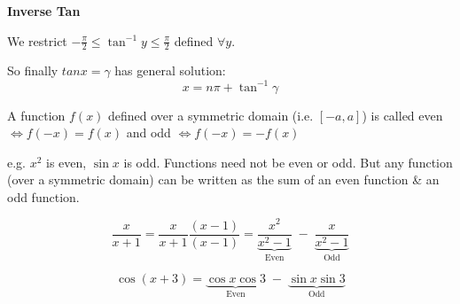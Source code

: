\documentclass[10pt]{scrartcl}
\begin{document}
\textbf{Inverse Tan}\\
\begin{minipage}{7cm}


We restrict $-\frac{\pi}{2} \leq \tan^{-1}y \leq \frac{\pi}{2}$ defined $\forall y$.

So finally $tanx = \gamma$ has general solution: 
\[\boxed{x = n\pi + \tan^{-1}\gamma}\]
\end{minipage}
\begin{minipage}{7cm}
  \begin{center}
\end{center}
\end{minipage}
\vspace*{10pt}

\vspace*{5pt}
\begin{definition} 
A function $f(x)$ defined over a symmetric domain (i.e. $[-a,a]$) is called even $\iff f(-x) = f(x)$ and odd $\iff f(-x) = -f(x)$
\end{definition}

e.g. $x^2$ is even, $\sin x$ is odd. Functions need not be even or odd. But any function (over a symmetric domain) can be written as the sum of an even function \& an odd function. \\

\begin{example}
\[\dfrac{x}{x+1} = \dfrac{x}{x+1} \dfrac{(x-1)}{(x-1)} = \underbrace{\dfrac{x^2}{x^2-1}}_{\text{Even}} \;-\; \underbrace{\dfrac{x}{x^2-1}}_{\text{Odd}}\]
\end{example}

\begin{example}
\[\cos(x+3) = \underbrace{\cos x \cos 3}_{\text{Even}} \; - \; \underbrace{\sin x \sin 3}_{\text{Odd}}\]
\end{example}
\end{document}
